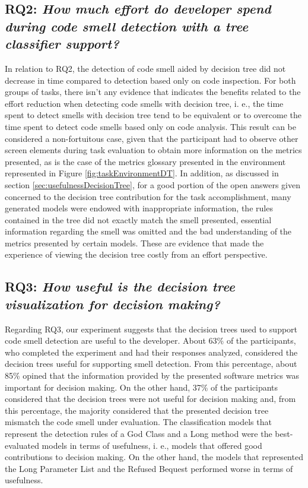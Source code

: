 \subsection{\textbf{RQ2}: \textit{How much effort do developer spend during code smell detection with a tree classifier support?}}

In relation to RQ2, the detection of code smell aided by decision tree did not decrease in time compared to detection based only on code inspection. For both groups of tasks, there isn't any evidence that indicates the benefits related to the effort reduction when detecting code smells with decision tree, i. e., the time spent to detect smells with decision tree tend to be equivalent or to overcome the time spent to detect code smells based only on code analysis. This result can be considered a non-fortuitous case, given that the participant had to observe other screen elements during task evaluation to obtain more information on the metrics presented, as is the case of the metrics glossary presented in the environment represented in Figure \ref{fig:taskEnvironmentDT}. In addition, as discussed in section \ref{sec:usefulnessDecisionTree}, for a good portion of the open answers given concerned to the decision tree contribution for the task accomplishment, many generated models were endowed with inappropriate information, the rules contained in the tree did not exactly match the smell presented, essential information regarding the smell was omitted and the bad understanding of the metrics presented by certain models. These are evidence that made the experience of viewing the decision tree costly from an effort perspective.

\subsection{\textbf{RQ3}: \textit{How useful is the decision tree visualization for decision making?}}

Regarding RQ3, our experiment suggests that the decision trees used to support code smell detection are useful to the developer. About 63\% of the participants, who completed the experiment and had their responses analyzed, considered the decision trees useful for supporting smell detection. From this percentage, about 85\% opined that the information provided by the presented software metrics was important for decision making. On the other hand, 37\% of the participants considered that the decision trees were not useful for decision making and, from this percentage, the majority considered that the presented decision tree mismatch the code smell under evaluation. The classification models that represent the detection rules of a God Class and a Long method were the best-evaluated models in terms of usefulness, i. e., models that offered good contributions to decision making. On the other hand, the models that represented the Long Parameter List and the Refused Bequest performed worse in terms of usefulness.

